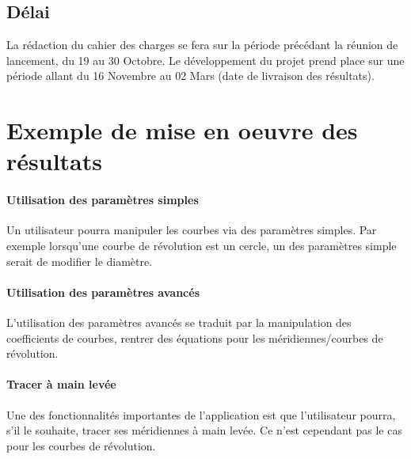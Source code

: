 \documentclass{scrartcl}
\begin{document}
	\subsection{Délai}
		La rédaction du cahier des charges se fera sur la période précédant la réunion de lancement, du 19 au 30 Octobre.
		Le développement du projet prend place sur une période allant du 16 Novembre au 02 Mars (date de livraison des résultats). 


\section{Exemple de mise en oeuvre des résultats}

		\paragraph{Utilisation des paramètres simples}
			Un utilisateur pourra manipuler les courbes via des paramètres simples. Par exemple lorsqu'une courbe de révolution est un cercle, un des paramètres simple serait de modifier le diamètre.
			
		\paragraph{Utilisation des paramètres avancés}
			L'utilisation des paramètres avancés se traduit par la manipulation des coefficients de courbes, rentrer des équations pour les méridiennes/courbes de révolution.
			
		\paragraph{Tracer à main levée}
			Une des fonctionnalités importantes de l'application est que l'utilisateur pourra, s'il le souhaite, tracer ses méridiennes à main levée. Ce n'est cependant pas le cas pour les courbes de révolution.
\end{document}

